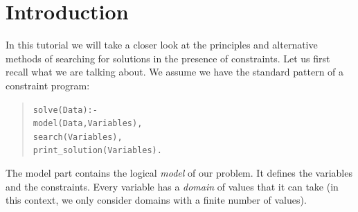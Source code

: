 %
% 
% 
% 
% 

%
%
%
%
%
%
%
%
%

\section{Introduction}
In this tutorial we will take a closer look at the principles and
alternative methods of searching for solutions in the presence of
constraints. Let us first recall what we are talking about.
We assume we have the standard pattern of a constraint program:
\begin{quote}\begin{alltt}
solve(Data) :-
        model(Data, Variables),
        search(Variables),
        print_solution(Variables).
\end{alltt}\end{quote}
The model part contains the logical {\em model} of our problem. It defines
the variables and the constraints.
Every variable has a {\em domain} of values that it can take
(in this context, we only consider domains with a finite number of values).

